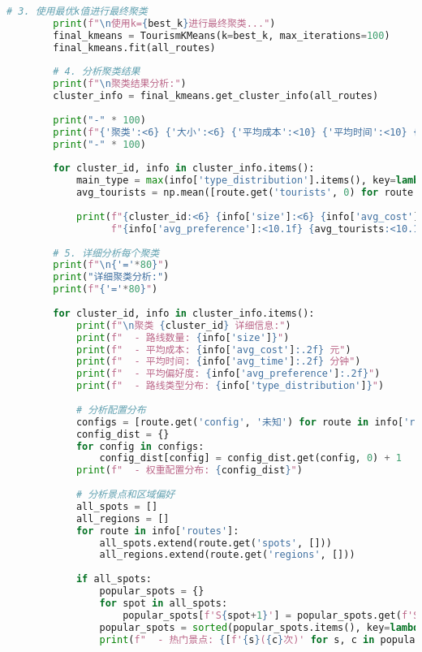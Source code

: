 \begin{lstlisting}[language=Python]
        # 3. 使用最优k值进行最终聚类
        print(f"\n使用k={best_k}进行最终聚类...")
        final_kmeans = TourismKMeans(k=best_k, max_iterations=100)
        final_kmeans.fit(all_routes)
        
        # 4. 分析聚类结果
        print(f"\n聚类结果分析:")
        cluster_info = final_kmeans.get_cluster_info(all_routes)
        
        print("-" * 100)
        print(f"{'聚类':<6} {'大小':<6} {'平均成本':<10} {'平均时间':<10} {'平均偏好':<10} {'平均游客':<10} {'主要类型':<15}")
        print("-" * 100)
        
        for cluster_id, info in cluster_info.items():
            main_type = max(info['type_distribution'].items(), key=lambda x: x[1])[0] if info['type_distribution'] else "未知"
            avg_tourists = np.mean([route.get('tourists', 0) for route in info['routes']])
            
            print(f"{cluster_id:<6} {info['size']:<6} {info['avg_cost']:<10.1f} {info['avg_time']:<10.1f} "
                  f"{info['avg_preference']:<10.1f} {avg_tourists:<10.1f} {main_type:<15}")
        
        # 5. 详细分析每个聚类
        print(f"\n{'='*80}")
        print("详细聚类分析:")
        print(f"{'='*80}")
        
        for cluster_id, info in cluster_info.items():
            print(f"\n聚类 {cluster_id} 详细信息:")
            print(f"  - 路线数量: {info['size']}")
            print(f"  - 平均成本: {info['avg_cost']:.2f} 元")
            print(f"  - 平均时间: {info['avg_time']:.2f} 分钟")
            print(f"  - 平均偏好度: {info['avg_preference']:.2f}")
            print(f"  - 路线类型分布: {info['type_distribution']}")
            
            # 分析配置分布
            configs = [route.get('config', '未知') for route in info['routes']]
            config_dist = {}
            for config in configs:
                config_dist[config] = config_dist.get(config, 0) + 1
            print(f"  - 权重配置分布: {config_dist}")
            
            # 分析景点和区域偏好
            all_spots = []
            all_regions = []
            for route in info['routes']:
                all_spots.extend(route.get('spots', []))
                all_regions.extend(route.get('regions', []))
            
            if all_spots:
                popular_spots = {}
                for spot in all_spots:
                    popular_spots[f'S{spot+1}'] = popular_spots.get(f'S{spot+1}', 0) + 1
                popular_spots = sorted(popular_spots.items(), key=lambda x: x[1], reverse=True)[:3]
                print(f"  - 热门景点: {[f'{s}({c}次)' for s, c in popular_spots]}")
            

\end{lstlisting}
